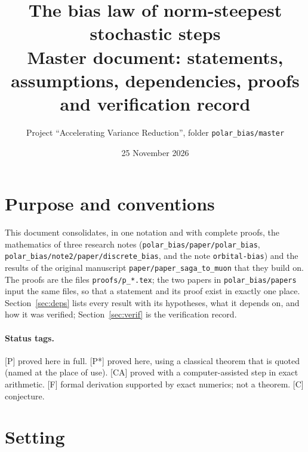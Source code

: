 \documentclass[10pt]{article}
\title{\vspace{-2em}The bias law of norm-steepest stochastic steps\\[2pt]
\large Master document: statements, assumptions, dependencies, proofs and verification record}
\author{Project ``Accelerating Variance Reduction'', folder \texttt{polar\_bias/master}}
\date{25 November 2026}
\theoremstyle{definition}
\theoremstyle{remark}
\newcommand{\status}[1]{\textsf{\small[#1]}}
\begin{document}
\maketitle
\tableofcontents

\section{Purpose and conventions}

This document consolidates, in one notation and with complete proofs, the mathematics of three research notes
(\texttt{polar\_bias/paper/polar\_bias}, \texttt{polar\_bias/note2/paper/discrete\_bias}, and the note \texttt{orbital-bias}) and the
results of the original manuscript \texttt{paper/paper\_saga\_to\_muon} that they build on. The proofs are the files
\texttt{proofs/p\_*.tex}; the two papers in \texttt{polar\_bias/papers} input the same files, so that a statement and its proof
exist in exactly one place. Section~\ref{sec:deps} lists every result with its hypotheses, what it depends on, and how
it was verified; Section~\ref{sec:verif} is the verification record.

\paragraph{Status tags.} \status{P} proved here in full. \status{P*} proved here, using a classical theorem that is quoted
(named at the place of use). \status{CA} proved with a computer-assisted step in exact arithmetic. \status{F} formal
derivation supported by exact numerics; not a theorem. \status{C} conjecture.

\section{Setting}\label{sec:setting}
\end{document}
